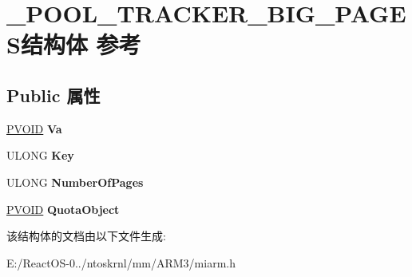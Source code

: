 \hypertarget{struct___p_o_o_l___t_r_a_c_k_e_r___b_i_g___p_a_g_e_s}{}\section{\+\_\+\+P\+O\+O\+L\+\_\+\+T\+R\+A\+C\+K\+E\+R\+\_\+\+B\+I\+G\+\_\+\+P\+A\+G\+E\+S结构体 参考}
\label{struct___p_o_o_l___t_r_a_c_k_e_r___b_i_g___p_a_g_e_s}
\subsection*{Public 属性}
\begin{DoxyCompactItemize}
\item 
\mbox{\label{struct___p_o_o_l___t_r_a_c_k_e_r___b_i_g___p_a_g_e_s_a93504d5fcf8f3d08cc77bf27d9d0ddb3}} 
\hyperlink{interfacevoid}{P\+V\+O\+ID} {\bfseries Va}
\item 
\mbox{\label{struct___p_o_o_l___t_r_a_c_k_e_r___b_i_g___p_a_g_e_s_a7563abe060f5733457161a9b8af95365}} 
U\+L\+O\+NG {\bfseries Key}
\item 
\mbox{\label{struct___p_o_o_l___t_r_a_c_k_e_r___b_i_g___p_a_g_e_s_aee7cab98b97dc24297910a7c6efa5b60}} 
U\+L\+O\+NG {\bfseries Number\+Of\+Pages}
\item 
\mbox{\label{struct___p_o_o_l___t_r_a_c_k_e_r___b_i_g___p_a_g_e_s_a0c9f81f9d315fc9d9849631a46736f2e}} 
\hyperlink{interfacevoid}{P\+V\+O\+ID} {\bfseries Quota\+Object}
\end{DoxyCompactItemize}


该结构体的文档由以下文件生成\+:\begin{DoxyCompactItemize}
\item 
E\+:/\+React\+O\+S-\/0../ntoskrnl/mm/\+A\+R\+M3/miarm.\+h\end{DoxyCompactItemize}
